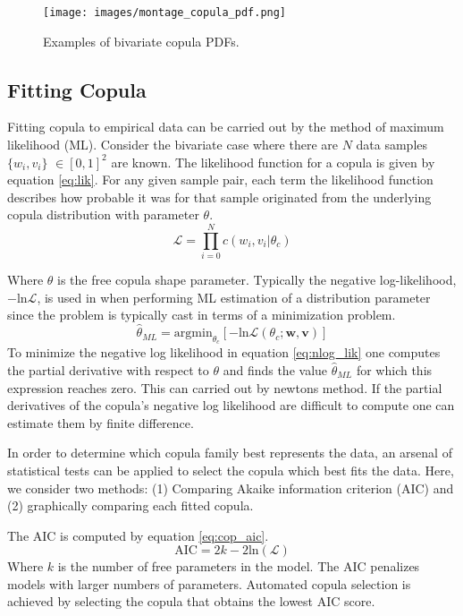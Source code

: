 \begin{figure}[!htbp]
	\centering
	\texttt{[image: images/montage\_copula\_pdf.png]}
	\caption{Examples of bivariate copula PDFs.}
	\label{fig:montage_cop}
\end{figure}

\subsection{Fitting Copula}
\label{sec:fitting_copula}

Fitting copula to empirical data can be carried out by the method of maximum likelihood (ML).  Consider the bivariate case where there are $N$ data samples $\{w_i, v_i\}$ $\in [0,1]^2$ are known. The likelihood function for a copula is given by equation \ref{eq:lik}.  For any given sample pair, each term the likelihood function describes how probable it was for that sample originated from the underlying copula distribution with parameter $\theta$.
\begin{equation}
\mathcal{L}= \prod_{i=0}^N c(w_i, v_i|\theta_c)
\label{eq:lik}
\end{equation}

Where $\theta$ is the free copula shape parameter.
Typically the negative log-likelihood, $-\mathrm{ln}\mathcal{L}$, is used in when performing ML estimation of a distribution parameter since the problem is typically cast in terms of a minimization problem.  
\begin{equation}
\hat \theta_{ML} = \mathrm{argmin}_{\theta_c}[-\mathrm{ln}\mathcal{L}(\theta_{c} ; \mathbf w, \mathbf v)]
\label{eq:nlog_lik}
\end{equation}
To minimize the negative log likelihood in equation \ref{eq:nlog_lik}  one computes the partial derivative with respect to $\theta$ and finds the value $\hat \theta_{ML}$ for which this expression reaches zero.  This can carried out by newtons method.  If the partial derivatives of the copula's negative log likelihood are difficult to compute one can estimate them by finite difference. 

In order to determine which copula family best represents the data, an arsenal of statistical tests can be applied to select the copula which best fits the data.  Here, we consider two methods:  (1) Comparing Akaike information criterion (AIC) and (2) graphically comparing each fitted copula.  

The AIC is computed by equation \ref{eq:cop_aic}.
\begin{equation}
\mathrm{AIC} = 2k - 2\mathrm{ln}(\mathcal{L})
\label{eq:cop_aic}
\end{equation}
Where $k$ is the number of free parameters in the model.  The AIC penalizes models with larger numbers of parameters. 
Automated copula selection is achieved by selecting the copula that obtains the lowest AIC score.

